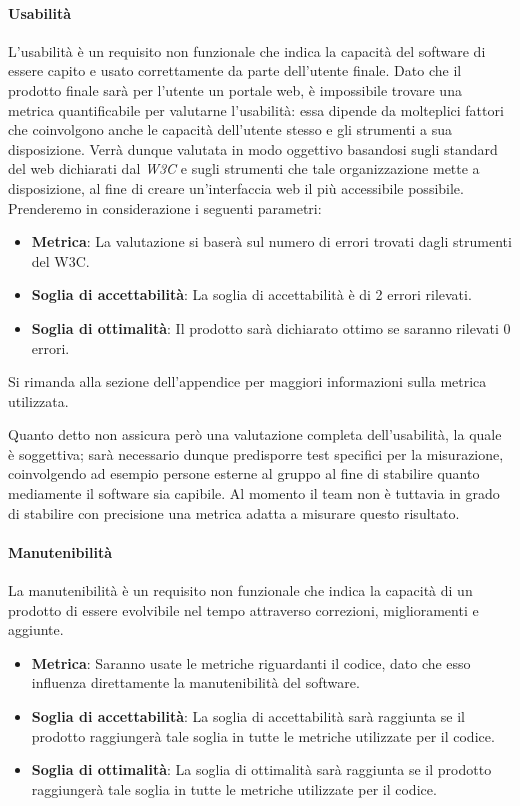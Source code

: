 \paragraph{Usabilità}
L'usabilità è un requisito non funzionale che indica la capacità del software di essere capito e usato correttamente da parte dell'utente finale. Dato che il prodotto finale sarà per l'utente un portale web, è impossibile trovare una metrica quantificabile per valutarne l'usabilità: essa dipende da molteplici fattori che coinvolgono anche le capacità dell'utente stesso e gli strumenti a sua disposizione. Verrà dunque valutata in modo oggettivo basandosi sugli standard del web dichiarati dal \emph{W3C} e sugli strumenti che tale organizzazione mette a disposizione, al fine di creare un'interfaccia web il più accessibile possibile.
Prenderemo in considerazione i seguenti parametri:
\begin{itemize}
	\item \textbf{Metrica}: La valutazione si baserà sul numero di errori trovati dagli strumenti del W3C.
	\item \textbf{Soglia di accettabilità}: La soglia di accettabilità è di 2 errori rilevati.
	\item \textbf{Soglia di ottimalità}: Il prodotto sarà dichiarato ottimo se saranno rilevati 0 errori.
\end{itemize}

Si rimanda alla sezione dell'appendice per maggiori informazioni sulla metrica utilizzata.

Quanto detto non assicura però una valutazione completa dell'usabilità, la quale è soggettiva; sarà necessario dunque predisporre test specifici per la misurazione, coinvolgendo ad esempio persone esterne al gruppo al fine di stabilire quanto mediamente il software sia capibile. Al momento il team non è tuttavia in grado di stabilire con precisione una metrica adatta a misurare questo risultato.

\paragraph{Manutenibilità}
La manutenibilità è un requisito non funzionale che indica la capacità di un prodotto di essere evolvibile nel tempo attraverso correzioni, miglioramenti e aggiunte.

\begin{itemize}
\item \textbf{Metrica}: Saranno usate le metriche riguardanti il codice, dato che esso influenza direttamente la manutenibilità del software.
\item \textbf{Soglia di accettabilità}: La soglia di accettabilità sarà raggiunta se il prodotto raggiungerà tale soglia in tutte le metriche utilizzate per il codice.
\item \textbf{Soglia di ottimalità}: La soglia di ottimalità sarà raggiunta se il prodotto raggiungerà tale soglia in tutte le metriche utilizzate per il codice.
\end{itemize}

